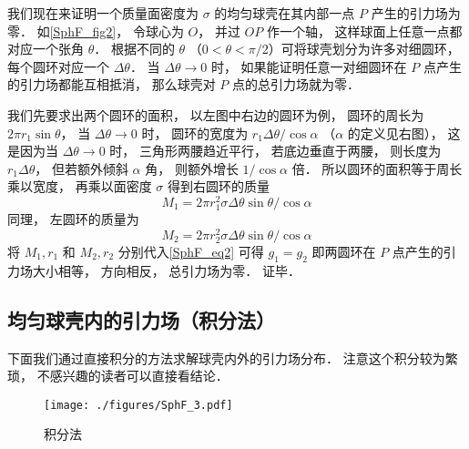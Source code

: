 我们现在来证明一个质量面密度为 $\sigma$ 的均匀球壳在其内部一点 $P$ 产生的引力场为零． 如\autoref{SphF_fig2}， 令球心为 $O$， 并过 $OP$ 作一个轴， 这样球面上任意一点都对应一个张角 $\theta$． 根据不同的 $\theta$ （$0 < \theta < \pi/2$）可将球壳划分为许多对细圆环， 每个圆环对应一个 $\Delta\theta$． 当 $\Delta\theta\to 0$ 时， 如果能证明任意一对细圆环在 $P$ 点产生的引力场都能互相抵消， 那么球壳对 $P$ 点的总引力场就为零．

我们先要求出两个圆环的面积， 以左图中右边的圆环为例， 圆环的周长为 $2\pi r_1\sin\theta$， 当 $\Delta\theta\to 0$ 时， 圆环的宽度为 $r_1\Delta\theta/\cos\alpha$ （$\alpha$ 的定义见右图）， 这是因为当 $\Delta \theta \to 0$ 时， 三角形两腰趋近平行， 若底边垂直于两腰， 则长度为 $r_1\Delta\theta$， 但若额外倾斜 $\alpha$ 角， 则额外增长 $1/\cos\alpha$ 倍． 所以圆环的面积等于周长乘以宽度， 再乘以面密度 $\sigma$ 得到右圆环的质量
\begin{equation}
M_1 = 2\pi r_1^2 \sigma \Delta\theta\sin\theta /\cos\alpha
\end{equation}
同理， 左圆环的质量为
\begin{equation}
M_2 = 2\pi r_2^2 \sigma \Delta\theta\sin\theta /\cos\alpha
\end{equation}
将 $M_1, r_1$ 和 $M_2, r_2$ 分别代入\autoref{SphF_eq2} 可得 $g_1 = g_2$ 即两圆环在 $P$ 点产生的引力场大小相等， 方向相反， 总引力场为零． 证毕．

\subsection{均匀球壳内的引力场（积分法）}
下面我们通过直接积分的方法求解球壳内外的引力场分布． 注意这个积分较为繁琐， 不感兴趣的读者可以直接看结论．

\begin{figure}[ht]
\centering
\texttt{[image: ./figures/SphF\_3.pdf]}
\caption{积分法} \label{SphF_fig3}
\end{figure}

